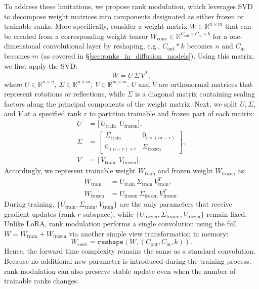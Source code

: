 To address these limitations, we propose rank modulation, which leverages SVD to decompose weight matrices into components designated as either frozen or trainable ranks. More specifically, consider a weight matrix 
$
  W \in \mathbb{R}^{n \times m}
$
that can be created from a corresponding weight tensor \( W_{\text{conv}} \in \mathbb{R}^{C_{\text{out}} \times C_{\text{in}} \times k}\) for a one-dimensional convolutional layer by reshaping, e.g., $C_{\text{out}} * k$ becomes $n$ and $C_{\text{in}}$ becomes $m$ (as covered in \S\ref{sec:ranks_in_diffusion_models}).  Using this matrix, we first apply the SVD:
$$
   W = U\,\Sigma\,V^T,
$$
where 
$
  U \in \mathbb{R}^{n \times n},\,
  \Sigma \in \mathbb{R}^{n \times m},\,
  V \in \mathbb{R}^{m \times m}.
$ 
$U$ and $V$ are orthonormal matrices that represent rotations or reflections, while $\Sigma$ is a diagonal matrix containing scaling factors along the principal components of the weight matrix.
Next, we split $U, \Sigma,$ and $V$ at a specified rank $r$ to partition trainable and frozen part of each matrix:
\begin{align*}
U &= 
\bigl[\,
   U_{\text{train}}\ \ U_{\text{frozen}}
\bigr],
\\
\Sigma &= 
\begin{bmatrix}
  \Sigma_{\text{train}} & 0_{r \times (m - r)} \\
  0_{(n - r) \times r} & \Sigma_{\text{frozen}}
\end{bmatrix},
\\
V &= 
\bigl[\,
   V_{\text{train}}\ \ V_{\text{frozen}}
\bigr].
\end{align*}
Accordingly, we represent trainable weight $W_{\text{train}}$ and frozen weight $W_{\text{frozen}}$ as:
\begin{align*}
W_{\text{train}} &= U_{\text{train}} \,\Sigma_{\text{train}}\,V_{\text{train}}^T, \\
W_{\text{frozen}} &= U_{\text{frozen}} \,\Sigma_{\text{frozen}}\,V_{\text{frozen}}^T. 
\end{align*}
During training, \(\{U_{\text{train}}, \Sigma_{\text{train}}, V_{\text{train}}\}\) are the only parameters that receive gradient updates (rank-\(r\) subspace), while \(\{U_{\text{frozen}}, \Sigma_{\text{frozen}}, V_{\text{frozen}}\}\) remain fixed. Unlike LoRA, rank modulation performs a single convolution using the full \(W = W_{\text{train}} + W_{\text{frozen}}\) via another simple view transformation in memory:
$$
W_{\text{conv}} = \texttt{reshape}(W, (C_{\text{out}}, C_{\text{in}}, k)). 
$$
Hence, the forward time complexity remains the same as a standard convolution. Because no additional new parameter is introduced during the training process, rank modulation can also preserve stable update even when the number of trainable ranks changes.

